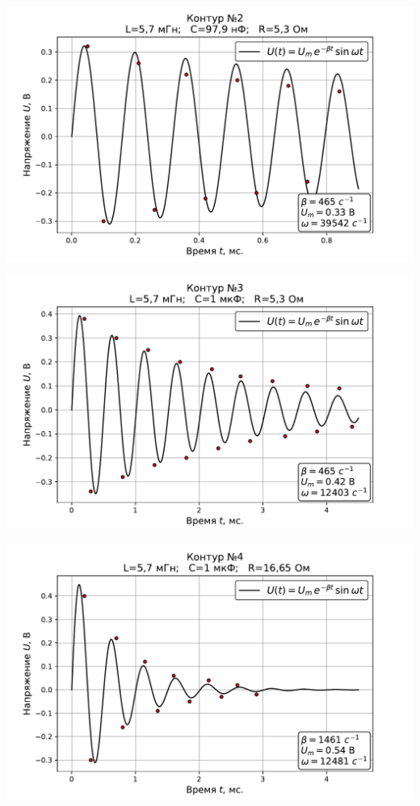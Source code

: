 \documentclass[ a4paper]{article}
\begin{document}
\begin{center}
	\includegraphics[scale=0.7]{2.pdf}
\end{center}

\begin{center}
	\includegraphics[scale=0.7]{3.pdf}
\end{center}

\begin{center}
	\includegraphics[scale=0.7]{4.pdf}
\end{center}
\end{document}
